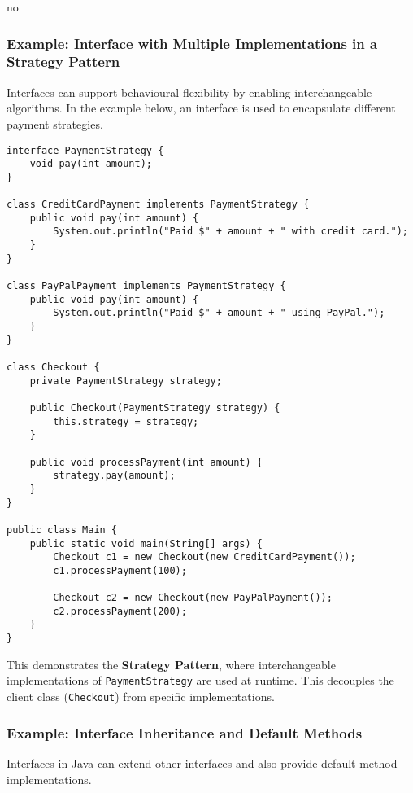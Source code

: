 no\documentclass{article}
\newcommand{\codecmd}[1]{\textcolor[rgb]{0,0.5,0}{\texttt{#1}}}
\begin{document}
\subsubsection*{Example: Interface with Multiple Implementations in a Strategy Pattern}

Interfaces can support behavioural flexibility by enabling interchangeable algorithms. In the example below, an interface is used to encapsulate different payment strategies.

\begin{verbatim}
interface PaymentStrategy {
    void pay(int amount);
}

class CreditCardPayment implements PaymentStrategy {
    public void pay(int amount) {
        System.out.println("Paid $" + amount + " with credit card.");
    }
}

class PayPalPayment implements PaymentStrategy {
    public void pay(int amount) {
        System.out.println("Paid $" + amount + " using PayPal.");
    }
}

class Checkout {
    private PaymentStrategy strategy;

    public Checkout(PaymentStrategy strategy) {
        this.strategy = strategy;
    }

    public void processPayment(int amount) {
        strategy.pay(amount);
    }
}

public class Main {
    public static void main(String[] args) {
        Checkout c1 = new Checkout(new CreditCardPayment());
        c1.processPayment(100);

        Checkout c2 = new Checkout(new PayPalPayment());
        c2.processPayment(200);
    }
}
\end{verbatim}

This demonstrates the \textbf{Strategy Pattern}, where interchangeable implementations of \codecmd{PaymentStrategy} are used at runtime. This decouples the client class (\codecmd{Checkout}) from specific implementations.

\subsubsection*{Example: Interface Inheritance and Default Methods}

Interfaces in Java can extend other interfaces and also provide default method implementations.
\end{document}
